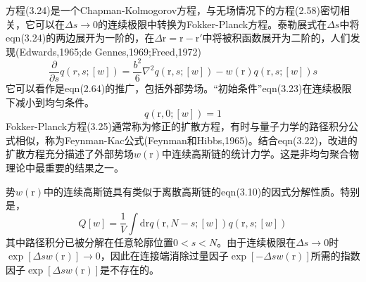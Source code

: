 方程(3.24)是一个Chapman-Kolmogorov方程，与无场情况下的方程(2.58)密切相关，它可以在$\Delta s\rightarrow 0$的连续极限中转换为Fokker-Planck方程。泰勒展式在$\Delta s$中将eqn(3.24)的两边展开为一阶的，在$\Delta\mathrm{r}=\mathrm{r}-\mathrm{r}'$中将被积函数展开为二阶的，人们发现(Edwards,1965;de Gennes,1969;Freed,1972)
\begin{equation}
\frac{\partial}{\partial s}q(r,s;[w])=\frac{b^2}{6}\nabla^2q(\mathrm{r},s;[w])-w(\mathrm{r})q(\mathrm{r},s;[w])s
\end{equation}
它可以看作是eqn(2.64)的推广，包括外部势场。“初始条件”eqn(3.23)在连续极限下减小到均匀条件。
\begin{equation}
q(\mathrm{r},0;[w])=1
\end{equation}
Fokker-Planck方程(3.25)通常称为修正的扩散方程，有时与量子力学的路径积分公式相似，称为Feynman-Kac公式(Feynman和Hibbs,1965)。结合eqn(3.22)，改进的扩散方程充分描述了外部势场$w(\mathrm{r})$中连续高斯链的统计力学。这是非均匀聚合物理论中最重要的结果之一。

势$w(\mathrm{r})$中的连续高斯链具有类似于离散高斯链的eqn(3.10)的因式分解性质。特别是，
\begin{equation}
Q[w]=\frac{1}{V}\int\mathrm{d}\mathrm{r}q(\mathrm{r},N-s;[w])q(\mathrm{r},s;[w])
\end{equation}
其中路径积分已被分解在任意轮廓位置$0<s<N$。由于连续极限在$\Delta s\rightarrow 0$时$\exp[\Delta sw(\mathrm{r})]\rightarrow 0$，因此在连接端消除过量因子$\exp[-\Delta sw(\mathrm{r})]$所需的指数因子$\exp[\Delta sw(\mathrm{r})]$是不存在的。


